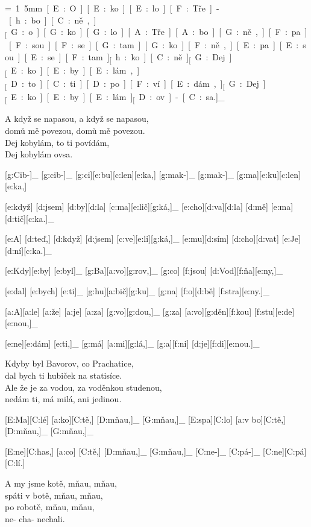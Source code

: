 
{\unit=1.5mm
[E:O][E:ko][E:lo] [F:Tře]-[h:bo][C:ně,]_

[G:o][G:ko][G:lo] [A:Tře][A:bo][G:ně,] %
[F:pa][F:sou] [F:se] [G:tam] [G:ko][F:ně,]

[E:pa][E:sou] [E:se] [F:tam]_ [h:ko][C:ně.]_

[G:Dej]_ [E:ko][E:by][E:lám,]_ [D:to] [C:ti] [D:po][F:ví][E:dám,]_

[G:Dej]_ [E:ko][E:by][E:lám]_ [D:ov]-[C:sa.]_
}

A když se napasou, a když se napasou,\\
domů mě povezou, domů mě povezou.\\
Dej kobylám, to ti povídám,\\
Dej kobylám ovsa.



[g:Cib-]_ [g:cib-]_ [g:ci][e:bu][c:len][e:ka,] %
[g:mak-]_ [g:mak-]_ [g:ma][e:ku][c:len][e:ka,]

[e:když] [d:jsem] [d:by][d:la] [c:ma][e:lič][g:ká,]_
[e:cho][d:va][d:la] [d:mě] [e:ma][d:tič][c:ka.]_

[e:A] [d:teď,] [d:když] [d:jsem] [c:ve][e:li][g:ká,]_
[e:mu][d:sím] [d:cho][d:vat] [e:Je][d:ní][c:ka.]_



[e:Kdy][e:by] [e:byl]_ [g:Ba][a:vo][g:rov,]_
[g:co] [f:jsou] [d:Vod][f:ňa][e:ny,]_

[e:dal] [e:bych] [e:ti]_ [g:hu][a:bič][g:ku]_
[g:na] [f:o][d:bě] [f:stra][e:ny.]_

[a:A][a:le] [a:že] [a:je] [a:za] [g:vo][g:dou,]_
[g:za] [a:vo][g:děn][f:kou] [f:stu][e:de][e:nou,]_

[e:ne][e:dám] [e:ti,]_ [g:má] [a:mi][g:lá,]_
[g:a][f:ni] [d:je][f:di][e:nou.]_

Kdyby byl Bavorov, co Prachatice,\\
dal bych ti hubiček na statisíce.\\
Ale že je za vodou, za voděnkou studenou,\\
nedám ti, má milá, ani jedinou.



[E:Ma][C:lé] [a:ko][C:tě,] [D:mňau,]_ [G:mňau,]_
[E:spa][C:lo] [a:v bo][C:tě,] [D:mňau,]_ [G:mňau,]_

[E:ne][C:has,] [a:co] [C:tě,] [D:mňau,]_ [G:mňau,]_
[C:ne-]_ [C:pá-]_ [C:ne][C:pá][C:lí.]

A my jsme kotě, mňau, mňau,\\
spáti v botě, mňau, mňau,\\
po robotě, mňau, mňau,\\
ne- cha- nechali.

